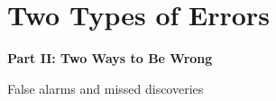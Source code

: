 \documentclass[aspectratio=169]{beamer}
\begin{document}
\section{Two Types of Errors}

\begin{frame}
\begin{center}
  \vspace{1.5cm}
  {\Huge\bfseries\textcolor{popblue}{Part II: Two Ways to Be Wrong}}

  \vspace{0.8cm}
  {\large False alarms and missed discoveries}
\end{center}
\end{frame}
\end{document}
